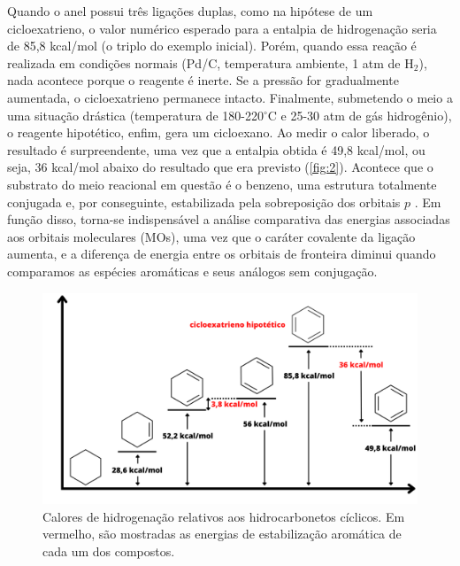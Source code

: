 Quando o anel possui três ligações duplas, como na hipótese de um cicloexatrieno, o valor numérico esperado para a entalpia de hidrogenação seria de 85,8 kcal/mol (o triplo do exemplo inicial). Porém, quando essa reação é realizada em condições normais (Pd/C, temperatura ambiente, 1 atm de H$_2$), nada acontece porque o reagente é inerte. Se a pressão for gradualmente aumentada, o cicloexatrieno permanece intacto. Finalmente, submetendo o meio a uma situação drástica (temperatura de 180-220$^\circ$C e 25-30 atm de gás hidrogênio), o reagente hipotético, enfim, gera um cicloexano. Ao medir o calor liberado, o resultado é surpreendente, uma vez que a entalpia obtida é 49,8 kcal/mol, ou seja, 36 kcal/mol abaixo do resultado que era previsto (\autoref{fig:2}). Acontece que o substrato do meio reacional em questão é o benzeno, uma estrutura totalmente conjugada e, por conseguinte, estabilizada pela sobreposição dos orbitais $p$ \autocite{Shaabani2008, Xu2021}. Em função disso, torna-se indispensável a análise comparativa das energias associadas aos orbitais moleculares (\gls{MOs}), uma vez que o caráter covalente da ligação aumenta, e a diferença de energia entre os orbitais de fronteira diminui quando comparamos as espécies aromáticas e seus análogos sem conjugação.

\begin{figure}[htb]
	\caption{\label{fig:2} Calores de hidrogenação relativos aos hidrocarbonetos cíclicos. Em vermelho, são mostradas as energias de estabilização aromática de cada um dos compostos.}
	\begin{center}
		\includegraphics[width=1.0\textwidth]{images/fig2(1).png}
	\end{center}
\end{figure}


